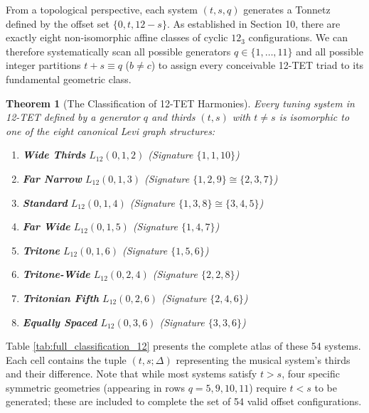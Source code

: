 \documentclass[12pt,letterpaper]{amsart}
\newtheorem{theorem}{Theorem}
\begin{document}
From a topological perspective, each system $(t,s,q)$ generates a Tonnetz defined by the offset set $\{0, t, 12-s\}$. As established in Section 10, there are exactly eight non-isomorphic affine classes of cyclic $12_3$ configurations. We can therefore systematically scan all possible generators $q \in \{1, \dots, 11\}$ and all possible integer partitions $t+s \equiv q$ ($b \neq c$) to assign every conceivable 12-TET triad to its fundamental geometric class.

\begin{theorem}[The Classification of 12-TET Harmonies]
Every tuning system in 12-TET defined by a generator $q$ and thirds $(t,s)$ with $t \neq s$ is isomorphic to one of the eight canonical Levi graph structures:
\begin{enumerate}
    \item \textbf{Wide Thirds} $L_{12}(0,1,2)$ (Signature $\{1,1,10\}$)
    \item \textbf{Far Narrow} $L_{12}(0,1,3)$ (Signature $\{1,2,9\} \cong \{2,3,7\}$)
    \item \textbf{Standard} $L_{12}(0,1,4)$ (Signature $\{1,3,8\} \cong \{3,4,5\}$)
    \item \textbf{Far Wide} $L_{12}(0,1,5)$ (Signature $\{1,4,7\}$)
    \item \textbf{Tritone} $L_{12}(0,1,6)$ (Signature $\{1,5,6\}$)
    \item \textbf{Tritone-Wide} $L_{12}(0,2,4)$ (Signature $\{2,2,8\}$)
    \item \textbf{Tritonian Fifth} $L_{12}(0,2,6)$ (Signature $\{2,4,6\}$)
    \item \textbf{Equally Spaced} $L_{12}(0,3,6)$ (Signature $\{3,3,6\}$)
\end{enumerate}
\end{theorem}

Table \ref{tab:full_classification_12} presents the complete atlas of these 54 systems. Each cell contains the tuple $(t, s; \Delta)$ representing the musical system's thirds and their difference. Note that while most systems satisfy $t > s$, four specific symmetric geometries (appearing in rows $q=5, 9, 10, 11$) require $t < s$ to be generated; these are included to complete the set of 54 valid offset configurations.
\end{document}
